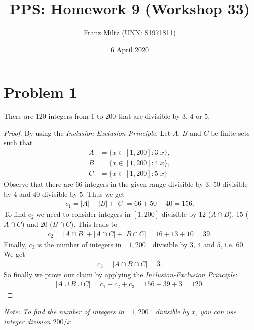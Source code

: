 \documentclass{article}
\title{PPS: Homework 9 (Workshop 33)}
\author{Franz Miltz (UNN: S1971811)}
\date{6 April 2020}
\begin{document}
\maketitle

\section*{Problem 1}
\begin{claim}
  There are $120$ integers from $1$ to $200$ that are divisible by $3$, $4$ or $5$.
\end{claim}
\begin{proof}
  By using the \emph{Inclusion-Exclusion Principle}.
  Let $A$, $B$ and $C$ be finite sets such that
  \begin{align*}
    A & = \{x\in [1,200] : 3 | x\}, \\
    B & = \{x \in [1,200] : 4|x\},  \\
    C & = \{x\in [1,200] : 5|x\}
  \end{align*}
  Observe that there are $66$ integers in the given range divisible by $3$, $50$ divisible by $4$ and $40$ divisible by $5$.
  Thus we get
  \begin{align*}
    c_1 = |A| + |B| + |C| = 66 + 50 + 40 = 156.
  \end{align*}
  To find $c_2$ we need to consider integers in $[1,200]$ divisible by $12$ ($A\cap B$), $15$ ($A\cap C$) and $20$ ($B\cap C$). This leads to
  \begin{align*}
    c_2 = |A\cap B| + |A\cap C| + |B \cap C| = 16 + 13 + 10 = 39.
  \end{align*}
  Finally, $c_3$ is the number of integers in $[1,200]$ divisible by $3$, $4$ and $5$, i.e. $60$. We get
  \begin{align*}
    c_3 = |A\cap B \cap C| = 3.
  \end{align*}
  So finally we prove our claim by applying the \emph{Inclusion-Exclusion Principle}:
  \begin{align*}
    |A\cup B \cup C| = c_1- c_2 + c_3 = 156 - 39 + 3 = 120.
  \end{align*}
\end{proof}
\noindent\emph{Note: To find the number of integers in $[1,200]$ divisible by $x$, you can use integer division $200 / x$}.
\end{document}
